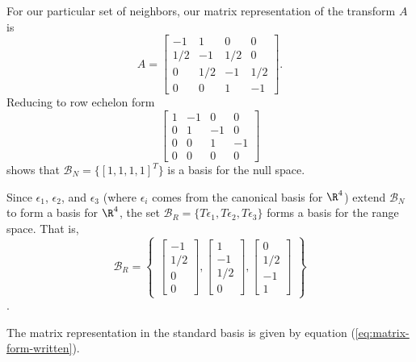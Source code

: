 \documentclass{homework}
\begin{document}
\begin{letterenum}
        For our particular set of neighbors, our matrix representation of the transform $A$
        is
        \begin{equation}
            \boxed{A = \begin{bmatrix}
                -1 & 1 & 0 & 0 \\
                1/2 & -1 & 1/2 & 0 \\
                0 & 1/2 & -1 & 1/2 \\
                0 & 0 & 1 & -1
            \end{bmatrix}}.
            \label{eq:matrix-form-written}
        \end{equation}
        Reducing to row echelon form
        \begin{equation}
            \begin{bmatrix}
                1 & -1 & 0 & 0 \\
                0 & 1 & -1 & 0 \\
                0 & 0 & 1 & -1 \\
                0 & 0 & 0 & 0
            \end{bmatrix}
        \end{equation}
        shows that $\boxed{\mathcal{B}_N = \{[1, 1, 1, 1]^T\}}$
        is a basis for the null space.

        Since $\epsilon_1$, $\epsilon_2$, and $\epsilon_3$ (where $\epsilon_i$ comes from
        the canonical basis for $\R^4$) extend $\mathcal{B}_N$ to form a basis
        for $\R^4$, the set $\mathcal{B}_R = \{T\epsilon_1, T\epsilon_2, T\epsilon_3\}$ forms
        a basis for the range space. That is,
        \begin{equation}
            \boxed{
            \mathcal{B}_R = \begin{Bmatrix}
                \begin{bmatrix}
                    -1 \\ 1/2 \\ 0 \\ 0
                \end{bmatrix}, \begin{bmatrix}
                    1 \\ -1 \\ 1/2 \\ 0
                \end{bmatrix}, \begin{bmatrix}
                    0 \\ 1/2 \\ -1 \\ 1
                \end{bmatrix}
            \end{Bmatrix}
            }
        \end{equation}.
        \item The matrix representation in the standard basis is given by
        equation (\ref{eq:matrix-form-written}).



\end{letterenum}
\end{document}
